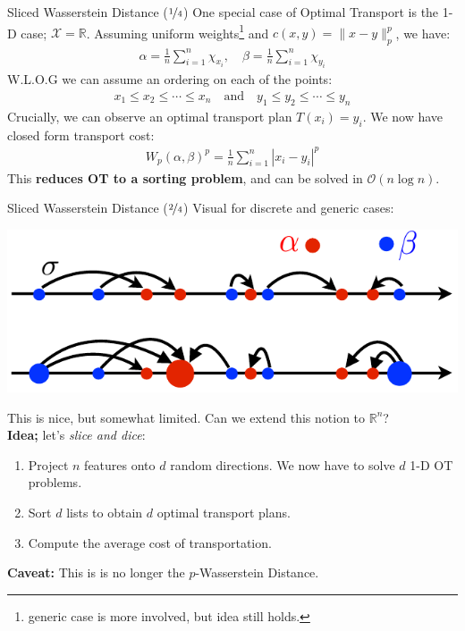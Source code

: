 \documentclass{beamer}
\begin{document}
\begin{frame}{Sliced Wasserstein Distance ($\nicefrac{1}{4}$)}
	One special case of Optimal Transport is the 1-D case; $\mathcal{X} = \mathbb{R}$. Assuming uniform weights\footnote{generic case is more involved, but idea still holds.} and $c(x, y) = \| x - y \|^p_p$, we have:
	\begin{gather}
		\alpha = \frac{1}{n} \sum^n_{i=1} \chi_{x_i}, \quad \beta = \frac{1}{n} \sum^n_{i=1} \chi_{y_i}
	\end{gather} \pause
	W.L.O.G we can assume an ordering on each of the points:
	\begin{gather}
		x_1 \leq x_2 \leq \cdots \leq x_n \quad \text{and} \quad y_1 \leq y_2 \leq \cdots \leq y_n
	\end{gather} \pause
	Crucially, we can observe an optimal transport plan $T(x_i) = y_i$. \pause We now have closed form transport cost:
	\vspace{-1em}
	\begin{gather}
		W_p (\alpha, \beta)^p = \frac{1}{n} \sum^n_{i=1} |x_i - y_i|^p
	\end{gather} \pause
	\vspace{1em}
	This \textbf{reduces OT to a sorting problem}, and can be solved in $\mathcal{O}(n \log n)$.
\end{frame}

\begin{frame}{Sliced Wasserstein Distance ($\nicefrac{2}{4}$)}
	Visual for discrete and generic cases:
	\vspace{-1em}
	\begin{center}
		\includegraphics[width=.65\textwidth]{img/1d-schematic}
	\end{center} \pause
	\vspace{-1em}

	This is nice, but somewhat limited. Can we extend this notion to $\mathbb{R}^n$? \pause \newline \\

	\textbf{Idea;} let's \textit{slice and dice}:
	\begin{enumerate}[label=\arabic*.]
		\item Project $n$ features onto $d$ random directions. \pause We now have to solve $d$ 1-D OT problems. \pause
		\item Sort $d$ lists to obtain $d$ optimal transport plans. \pause
		\item Compute the average cost of transportation. \pause
	\end{enumerate}
	
	\textbf{Caveat:} This is is no longer the $p$-Wasserstein Distance.
\end{frame}
\end{document}
